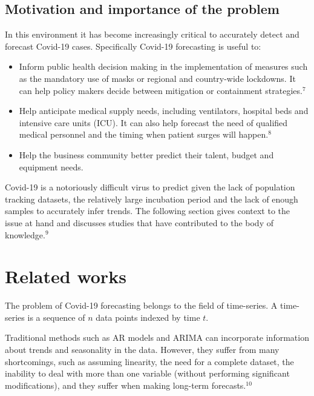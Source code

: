 \documentclass{article}
\begin{document}
\subsection{Motivation and importance of the problem}
In this environment it has become increasingly critical to accurately detect and forecast Covid-19 cases. Specifically Covid-19 forecasting is useful to:
\begin{itemize}
	\item Inform public health decision making in the implementation of measures such as the mandatory use of masks or regional and country-wide lockdowns. It can help policy makers decide between mitigation or containment strategies.$^{7}$
	\item Help anticipate medical supply needs, including ventilators, hospital beds and intensive care units (ICU). It can also help forecast the need of qualified medical personnel and the timing when patient surges will happen.$^{8}$
	\item Help the business community better predict their talent, budget and equipment needs.
\end{itemize}

Covid-19 is a notoriously difficult virus to predict given the lack of population tracking datasets, the relatively large incubation period and the lack of enough samples to accurately infer trends. The following section gives context to the issue at hand and discusses studies that have contributed to the body of knowledge.$^{9}$

\section{Related works}
The problem of Covid-19 forecasting belongs to the field of time-series. A time-series is a sequence of $n$ data points indexed by time $t$. 

Traditional methods such as AR models and ARIMA can incorporate information about trends and seasonality in the data. However, they suffer from many shortcomings, such as assuming linearity, the need for a complete dataset, the inability to deal with more than one variable (without performing significant modifications), and they suffer when making long-term forecasts.$^{10}$
\end{document}
